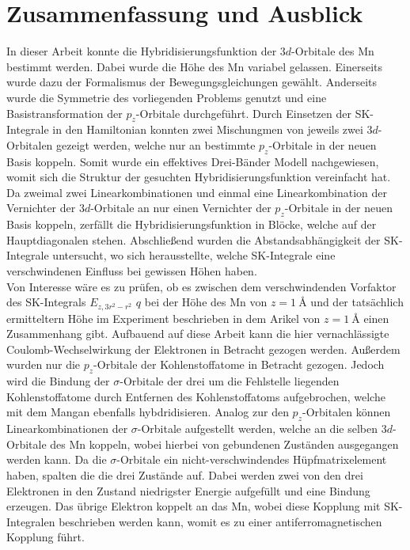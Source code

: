 \chapter{Zusammenfassung und Ausblick}
\label{chap:Zusammenfassung_und_Ausblick}
In dieser Arbeit konnte die Hybridisierungsfunktion der $3d$-Orbitale des Mn bestimmt werden.
Dabei wurde die Höhe des Mn variabel gelassen.
Einerseits wurde dazu der Formalismus der Bewegungsgleichungen gewählt.
Anderseits wurde die Symmetrie des vorliegenden Problems genutzt und eine Basistransformation der $p_z$-Orbitale durchgeführt. 
Durch Einsetzen der SK-Integrale in den Hamiltonian konnten zwei Mischungmen von jeweils zwei $3d$-Orbitalen gezeigt werden, welche nur 
an bestimmte $p_z$-Orbitale in der neuen Basis koppeln.
Somit wurde ein effektives Drei-Bänder Modell nachgewiesen, womit sich die Struktur der gesuchten Hybridisierungsfunktion vereinfacht hat. 
Da zweimal zwei Linearkombinationen und einmal eine Linearkombination der Vernichter der $3d$-Orbitale an nur einen Vernichter der $p_z$-Orbitale in der neuen Basis 
koppeln, zerfällt die Hybridisierungsfunktion in Blöcke, welche auf der Hauptdiagonalen stehen. 
Abschließend wurden die Abstandsabhängigkeit der SK-Integrale untersucht, wo sich herausstellte, welche SK-Integrale 
eine verschwindenen Einfluss bei gewissen Höhen haben.\\
Von Interesse wäre es zu prüfen, ob es zwischen dem verschwindenden Vorfaktor des SK-Integrals $E_{z,3r^2-r^2}$ $q$ bei der Höhe 
des Mn von $z=\qty{1}{\angstrom}$ und der tatsächlich ermitteltern Höhe im Experiment beschrieben in dem 
Arikel \cite{doi:10.1021/acsnano.1c00139} von $z=\qty{1}{\angstrom}$ einen Zusammenhang gibt.
Aufbauend auf diese Arbeit kann die hier vernachlässigte Coulomb-Wechselwirkung der Elektronen in Betracht gezogen werden.
Außerdem wurden nur die $p_z$-Orbitale der Kohlenstoffatome in Betracht gezogen.
Jedoch wird die Bindung der $\sigma$-Orbitale der drei um die Fehlstelle liegenden Kohlenstoffatome durch Entfernen des Kohlenstoffatoms
aufgebrochen, welche mit dem Mangan ebenfalls hybdridisieren.
Analog zur den $p_z$-Orbitalen können Linearkombinationen der $\sigma$-Orbitale aufgestellt werden, welche an die selben 
$3d$-Orbitale des Mn koppeln, wobei hierbei von gebundenen Zuständen ausgegangen werden kann.
Da die $\sigma$-Orbitale ein nicht-verschwindendes Hüpfmatrixelement haben, spalten die die drei Zustände auf.
Dabei werden zwei von den drei Elektronen in den Zustand niedrigster Energie aufgefüllt und eine Bindung erzeugen. 
Das übrige Elektron koppelt an das Mn, wobei diese Kopplung mit SK-Integralen beschrieben werden kann, womit 
es zu einer antiferromagnetischen Kopplung führt.